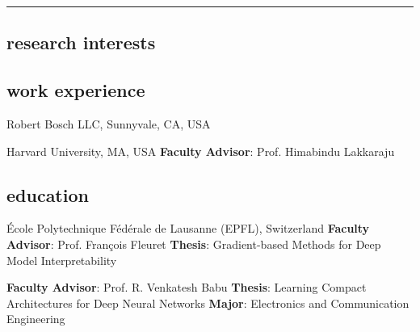 \documentclass[11pt, a4paper, english]{moderncv}        %
\newcommand{\cvsection}[1]{\vspace{0.3cm}\subsection{\Large{{#1}}}}
\begin{document}
\pagecolor{floralwhite}

\makecvtitle

\vspace{-1.7cm}
\textcolor{gray}{\hrule}


\cvsection{research interests}


\cvsection{work experience}

{\newline Robert Bosch LLC, Sunnyvale, CA, USA}{}{}

{\newline Harvard University, MA, USA}
{\newline \textbf{Faculty Advisor}: Prof. Himabindu Lakkaraju}{} 

\cvsection{education}
{ \newline \'{E}cole Polytechnique F\'{e}d\'{e}rale de Lausanne (EPFL), Switzerland}
{ \newline \textbf{Faculty Advisor}: Prof. Fran\c{c}ois Fleuret
  \newline \textbf{Thesis}: Gradient-based Methods for Deep Model Interpretability}
{}
\vspace*{0.5em}

{ \newline \textbf{Faculty Advisor}: Prof. R. Venkatesh Babu
\newline \textbf{Thesis}: Learning Compact Architectures for Deep Neural Networks}{} 
\vspace*{0.5em}
{\newline \textbf{Major}: Electronics and Communication Engineering}{} 
\end{document}
